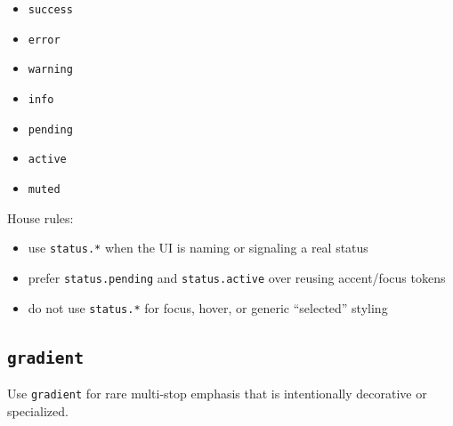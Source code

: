\begin{itemize}
\tightlist
\item
  \texttt{s\allowbreak{}u\allowbreak{}c\allowbreak{}c\allowbreak{}e\allowbreak{}s\allowbreak{}s}
\item
  \texttt{e\allowbreak{}r\allowbreak{}r\allowbreak{}o\allowbreak{}r}
\item
  \texttt{w\allowbreak{}a\allowbreak{}r\allowbreak{}n\allowbreak{}i\allowbreak{}n\allowbreak{}g}
\item
  \texttt{i\allowbreak{}n\allowbreak{}f\allowbreak{}o}
\item
  \texttt{p\allowbreak{}e\allowbreak{}n\allowbreak{}d\allowbreak{}i\allowbreak{}n\allowbreak{}g}
\item
  \texttt{a\allowbreak{}c\allowbreak{}t\allowbreak{}i\allowbreak{}v\allowbreak{}e}
\item
  \texttt{m\allowbreak{}u\allowbreak{}t\allowbreak{}e\allowbreak{}d}
\end{itemize}

House rules:

\begin{itemize}
\tightlist
\item
  use \texttt{s\allowbreak{}t\allowbreak{}a\allowbreak{}t\allowbreak{}u\allowbreak{}s\allowbreak{}.\allowbreak{}*} when the UI is naming or signaling a real status
\item
  prefer \texttt{s\allowbreak{}t\allowbreak{}a\allowbreak{}t\allowbreak{}u\allowbreak{}s\allowbreak{}.\allowbreak{}p\allowbreak{}e\allowbreak{}n\allowbreak{}d\allowbreak{}i\allowbreak{}n\allowbreak{}g} and \texttt{s\allowbreak{}t\allowbreak{}a\allowbreak{}t\allowbreak{}u\allowbreak{}s\allowbreak{}.\allowbreak{}a\allowbreak{}c\allowbreak{}t\allowbreak{}i\allowbreak{}v\allowbreak{}e} over reusing accent/focus tokens
\item
  do not use \texttt{s\allowbreak{}t\allowbreak{}a\allowbreak{}t\allowbreak{}u\allowbreak{}s\allowbreak{}.\allowbreak{}*} for focus, hover, or generic ``selected'' styling
\end{itemize}

\subsection{\texorpdfstring{\texttt{g\allowbreak{}r\allowbreak{}a\allowbreak{}d\allowbreak{}i\allowbreak{}e\allowbreak{}n\allowbreak{}t}}{}}\label{record-028-gradient}

Use \texttt{g\allowbreak{}r\allowbreak{}a\allowbreak{}d\allowbreak{}i\allowbreak{}e\allowbreak{}n\allowbreak{}t} for rare multi-stop emphasis that is intentionally decorative or specialized.

